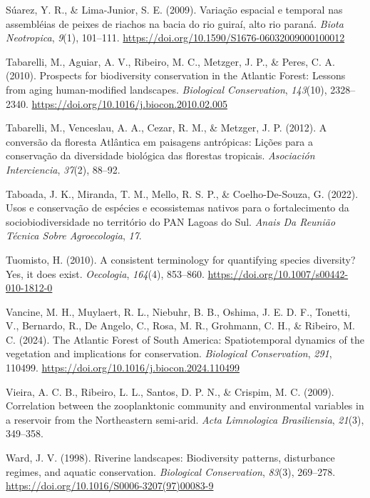 \documentclass[
  letterpaper,
  DIV=11,
  numbers=noendperiod]{scrartcl}
\newlength{\cslhangindent}
\newenvironment{CSLReferences}[2] %
 {\begin{list}{}{%
  \setlength{\itemindent}{0pt}
  \setlength{\leftmargin}{0pt}
  \setlength{\parsep}{0pt}
  \ifodd #1
   \setlength{\leftmargin}{\cslhangindent}
   \setlength{\itemindent}{-1\cslhangindent}
  \fi
  \setlength{\itemsep}{#2\baselineskip}}}
 {\end{list}}
\begin{document}
\begin{CSLReferences}{1}{0}
Súarez, Y. R., \& Lima-Junior, S. E. (2009). Variação espacial e
temporal nas assembléias de peixes de riachos na bacia do rio guiraí,
alto rio paraná. \emph{Biota Neotropica}, \emph{9}(1), 101--111.
\url{https://doi.org/10.1590/S1676-06032009000100012}

Tabarelli, M., Aguiar, A. V., Ribeiro, M. C., Metzger, J. P., \& Peres,
C. A. (2010). Prospects for biodiversity conservation in the Atlantic
Forest: Lessons from aging human-modified landscapes. \emph{Biological
Conservation}, \emph{143}(10), 2328--2340.
\url{https://doi.org/10.1016/j.biocon.2010.02.005}

Tabarelli, M., Venceslau, A. A., Cezar, R. M., \& Metzger, J. P. (2012).
A conversão da floresta Atlântica em paisagens antrópicas: Lições para a
conservação da diversidade biológica das florestas tropicais.
\emph{Asociación Interciencia}, \emph{37}(2), 88--92.

Taboada, J. K., Miranda, T. M., Mello, R. S. P., \& Coelho-De-Souza, G.
(2022). Usos e conservação de espécies e ecossistemas nativos para o
fortalecimento da sociobiodiversidade no território do PAN Lagoas do
Sul. \emph{Anais Da Reunião Técnica Sobre Agroecologia}, \emph{17}.

Tuomisto, H. (2010). A consistent terminology for quantifying species
diversity? Yes, it does exist. \emph{Oecologia}, \emph{164}(4),
853--860. \url{https://doi.org/10.1007/s00442-010-1812-0}

Vancine, M. H., Muylaert, R. L., Niebuhr, B. B., Oshima, J. E. D. F.,
Tonetti, V., Bernardo, R., De Angelo, C., Rosa, M. R., Grohmann, C. H.,
\& Ribeiro, M. C. (2024). The Atlantic Forest of South America:
Spatiotemporal dynamics of the vegetation and implications for
conservation. \emph{Biological Conservation}, \emph{291}, 110499.
\url{https://doi.org/10.1016/j.biocon.2024.110499}

Vieira, A. C. B., Ribeiro, L. L., Santos, D. P. N., \& Crispim, M. C.
(2009). Correlation between the zooplanktonic community and
environmental variables in a reservoir from the Northeastern semi-arid.
\emph{Acta Limnologica Brasiliensia}, \emph{21}(3), 349--358.

Ward, J. V. (1998). Riverine landscapes: Biodiversity patterns,
disturbance regimes, and aquatic conservation. \emph{Biological
Conservation}, \emph{83}(3), 269--278.
\url{https://doi.org/10.1016/S0006-3207(97)00083-9}


\end{CSLReferences}
\end{document}
